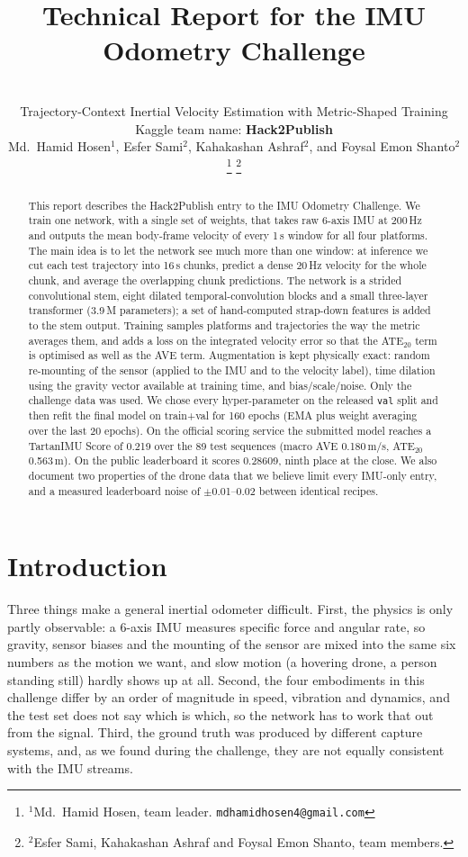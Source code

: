\documentclass[letterpaper,10pt,conference]{ieeeconf}
\title{\LARGE \bf Technical Report for the IMU Odometry Challenge}
\author{\\
Trajectory-Context Inertial Velocity Estimation with Metric-Shaped Training\\
Kaggle team name: \textbf{Hack2Publish}\\
Md.\ Hamid Hosen$^{1}$, Esfer Sami$^{2}$, Kahakashan Ashraf$^{2}$, and Foysal Emon Shanto$^{2}$%
\thanks{$^{1}$Md.\ Hamid Hosen, team leader. {\tt\small mdhamidhosen4@gmail.com}}%
\thanks{$^{2}$Esfer Sami, Kahakashan Ashraf and Foysal Emon Shanto, team members.}%
}
\begin{document}
\maketitle
\thispagestyle{empty}
\pagestyle{empty}

\begin{abstract}
This report describes the Hack2Publish entry to the IMU Odometry Challenge. We train one network, with a single
set of weights, that takes raw 6-axis IMU at 200\,Hz and outputs the mean body-frame velocity of every 1\,s window
for all four platforms. The main idea is to let the network see much more than one window: at inference we cut
each test trajectory into 16\,s chunks, predict a dense 20\,Hz velocity for the whole chunk, and average the
overlapping chunk predictions. The network is a strided convolutional stem, eight dilated temporal-convolution
blocks and a small three-layer transformer (3.9\,M parameters); a set of hand-computed strap-down features is added
to the stem output. Training samples platforms and trajectories the way the metric averages them, and adds a loss on
the integrated velocity error so that the ATE$_{20}$ term is optimised as well as the AVE term. Augmentation is kept
physically exact: random re-mounting of the sensor (applied to the IMU and to the velocity label), time dilation
using the gravity vector available at training time, and bias/scale/noise. Only the challenge data was used. We chose
every hyper-parameter on the released \texttt{val} split and then refit the final model on train+val for 160 epochs
(EMA plus weight averaging over the last 20 epochs). On the official scoring service the submitted model reaches a
TartanIMU Score of 0.219 over the 89 test sequences (macro AVE 0.180\,m/s, ATE$_{20}$ 0.563\,m). On the public
leaderboard it scores 0.28609, ninth place at the close. We also document two properties of the drone data that we
believe limit every IMU-only entry, and a measured leaderboard noise of $\pm$0.01--0.02 between identical recipes.
\end{abstract}

\section{Introduction}
Three things make a general inertial odometer difficult. First, the physics is only partly observable: a 6-axis
IMU measures specific force and angular rate, so gravity, sensor biases and the mounting of the sensor are mixed into
the same six numbers as the motion we want, and slow motion (a hovering drone, a person standing still) hardly shows
up at all. Second, the four embodiments in this challenge differ by an order of magnitude in speed, vibration and
dynamics, and the test set does not say which is which, so the network has to work that out from the signal. Third,
the ground truth was produced by different capture systems, and, as we found during the challenge, they are not
equally consistent with the IMU streams.
\end{document}
